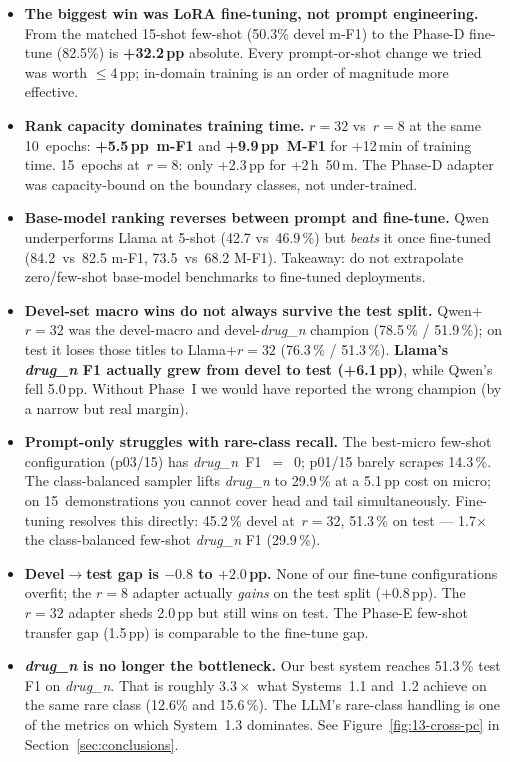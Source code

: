 \documentclass[a4paper,12pt]{article}
\begin{document}
\begin{itemize}[nosep]
    \item \textbf{The biggest win was LoRA fine-tuning, not prompt
    engineering.} From the matched 15-shot few-shot (50.3\% devel m-F1)
    to the Phase-D fine-tune (82.5\%) is \textbf{+32.2\,pp} absolute.
    Every prompt-or-shot change we tried was worth $\leq$4\,pp; in-domain
    training is an order of magnitude more effective.
    \item \textbf{Rank capacity dominates training time.} $r=32$
    vs~$r=8$ at the same 10~epochs: \textbf{+5.5\,pp~m-F1} and
    \textbf{+9.9\,pp~M-F1} for +12\,min of training time. 15~epochs
    at~$r=8$: only +2.3\,pp for +2\,h~50\,m. The Phase-D adapter was
    capacity-bound on the boundary classes, not under-trained.
    \item \textbf{Base-model ranking reverses between prompt and
    fine-tune.} Qwen underperforms Llama at 5-shot
    (42.7 vs~46.9\,\%) but \emph{beats} it once fine-tuned
    (84.2~vs~82.5 m-F1, 73.5~vs~68.2 M-F1). Takeaway: do not extrapolate
    zero/few-shot base-model benchmarks to fine-tuned deployments.
    \item \textbf{Devel-set macro wins do not always survive the test
    split.} Qwen+$r=32$ was the devel-macro and devel-\textit{drug\_n}
    champion (78.5\,\% / 51.9\,\%); on test it loses those titles to
    Llama+$r=32$ (76.3\,\% / 51.3\,\%). \textbf{Llama's
    \textit{drug\_n} F1 actually grew from devel to test
    (+6.1\,pp)}, while Qwen's fell 5.0\,pp. Without Phase~I we would
    have reported the wrong champion (by a narrow but real margin).
    \item \textbf{Prompt-only struggles with rare-class recall.} The
    best-micro few-shot configuration (p03/15) has
    \textit{drug\_n}~F1~$=$~0; p01/15 barely scrapes 14.3\,\%. The
    class-balanced sampler lifts \textit{drug\_n} to 29.9\,\% at a
    5.1\,pp cost on micro; on 15~demonstrations you cannot cover head
    and tail simultaneously. Fine-tuning resolves this directly:
    45.2\,\% devel at~$r=32$, 51.3\,\% on test --- 1.7$\times$ the
    class-balanced few-shot \textit{drug\_n} F1 (29.9\,\%).
    \item \textbf{Devel$\to$test gap is $-0.8$ to $+2.0$\,pp.} None of
    our fine-tune configurations overfit; the $r=8$ adapter actually
    \emph{gains} on the test split ($+0.8$\,pp). The $r=32$ adapter
    sheds 2.0\,pp but still wins on test. The Phase-E few-shot
    transfer gap (1.5\,pp) is comparable to the fine-tune gap.
    \item \textbf{\textit{drug\_n} is no longer the bottleneck.} Our
    best system reaches 51.3\,\% test F1 on \textit{drug\_n}. That is
    roughly $\mathbf{3.3\times}$ what Systems~1.1 and~1.2 achieve on
    the same rare class (12.6\% and 15.6\,\%). The LLM's rare-class
    handling is one of the metrics on which System~1.3 dominates. See
    Figure~\ref{fig:13-cross-pc} in Section~\ref{sec:conclusions}.
\end{itemize}
\end{document}
